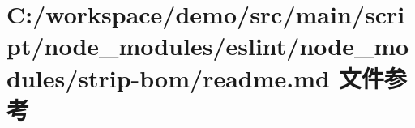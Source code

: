 \hypertarget{node__modules_2eslint_2node__modules_2strip-bom_2_r_e_a_d_m_e_8md}{}\section{C\+:/workspace/demo/src/main/script/node\+\_\+modules/eslint/node\+\_\+modules/strip-\/bom/readme.md 文件参考}
\label{node__modules_2eslint_2node__modules_2strip-bom_2_r_e_a_d_m_e_8md}
